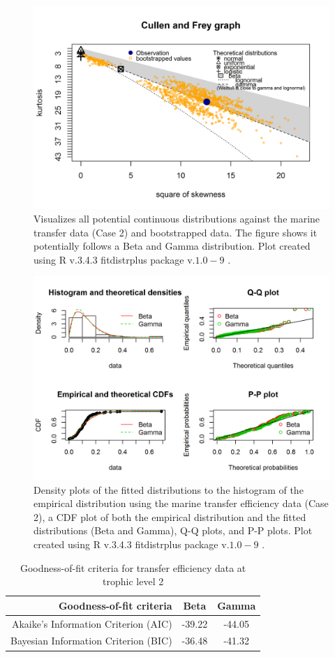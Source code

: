 \documentclass[oneside,12pt,final]{sty/ucthesis-CA2012}
\let\cite\citep                             %
\begin{document}
\begin{mainmatter}
\begin{figure}[H]
     \centering
       \includegraphics[width=.8\textwidth]{fig/cullen_frey_te}
    \caption{Visualizes all potential continuous distributions against the marine transfer data (Case 2) and bootstrapped data. The figure shows it potentially follows a Beta and Gamma distribution. Plot created using R v.3.4.3 \cite{Rcite} fitdistrplus package v.$1.0-9$ \cite{fitdistrplus}. }
    \label{cf_te_a2}
\end{figure}

\begin{figure}[H]
     \centering
       \includegraphics[width=.8\textwidth]{fig/gof_te}
    \caption{Density plots of the fitted distributions to the histogram of the empirical distribution using the marine transfer efficiency data (Case 2), a CDF plot of both the empirical distribution and the fitted distributions (Beta and Gamma), Q-Q plots, and P-P plots. Plot created using R v.3.4.3 \cite{Rcite} fitdistrplus package v.$1.0-9$ \cite{fitdistrplus}. }
    \label{gof_te_a2}
\end{figure}

\begin{table}[H]
\centering
\caption{Goodness-of-fit criteria for transfer efficiency data at trophic level 2}
\begin{tabular}{r|c|c}
  \hline \small
 Goodness-of-fit criteria & Beta  & Gamma \\ 
   \hline
   Akaike's Information Criterion (AIC) & -39.22 & -44.05 \\   
   Bayesian Information Criterion (BIC) & -36.48 &  -41.32  \\
   \hline
\end{tabular} 
\label{te2_aic}
\end{table}


\end{mainmatter}
\end{document}
